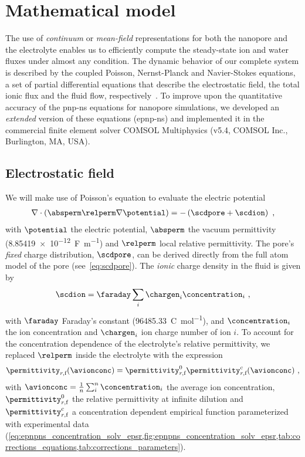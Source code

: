 \section{Mathematical model}
%
\label{sec:epnp-ns:model}
%

The use of \emph{continuum} or \emph{mean-field} representations for both the nanopore and the electrolyte
enables us to efficiently compute the steady-state ion and water fluxes under almost any condition. The
dynamic behavior of our complete system is described by the coupled Poisson, Nernst-Planck and Navier-Stokes
equations, a set of partial differential equations that describe the electrostatic field, the total ionic flux
and the fluid flow, respectively~\cite{Eisenberg-1996,Cervera-2005,Lu-2012}. To improve upon the quantitative
accuracy of the \gls{pnp-ns} equations for nanopore simulations, we developed an \emph{extended} version of
these equations ({\gls{epnp-ns}}) and implemented it in the commercial finite element solver {COMSOL}
Multiphysics (v5.4, COMSOL Inc., Burlington, MA, USA). 

\subsection{Electrostatic field}
%
\label{sec:epnp-ns:electrostatic_field}
%

We will make use of Poisson's equation to evaluate the electric potential
%
\begin{align}
  \label{eq:poisson}
  \nabla \cdot \left(\absperm \relperm \nabla \potential \right) = -\left( \scdpore + \scdion \right)
  \text{ ,}
\end{align}
%
with $\potential$ the electric potential, $\absperm$ the vacuum permittivity
(\SI{8.85419e-12}{\farad\per\meter}) and $\relperm$ local relative permittivity. The pore's \emph{fixed}
charge distribution, $\scdpore$,  can be derived directly from the full atom model of the pore
(see~\cref{eq:scdpore}). The \emph{ionic} charge density in the fluid is given by
%
\begin{align}\label{eq:scdion}
  \scdion = \faraday\sum_{i}\chargen_{i}\concentration_{i}
  \text{ ,}
\end{align}
%
with $\faraday$ Faraday's constant (\SI{96485.33}{\coulomb\per\mole}), and $\concentration_{i}$ the ion
concentration and $\chargen_{i}$ ion charge number of ion $i$. To account for the concentration dependence of
the electrolyte's relative permittivity, we replaced $\relperm$ inside the electrolyte with the expression
%
\begin{align}\label{eq:epnp-ns_relperm_concentration}
  \permittivity_{r,\text{f}}(\avionconc) =
        \permittivity_{r,\text{f}}^0 \permittivity_{r,\text{f}}^c(\avionconc)
  \text{ ,}
\end{align}
%
with $\avionconc=\frac{1}{n}\sum_{i}^{n}\concentration_{i}$ the average ion concentration,
$\permittivity_{r,\text{f}}^0$ the relative permittivity at infinite dilution and
$\permittivity_{r,\text{f}}^c$ a concentration dependent empirical function parameterized with experimental
data
(\cref{eq:epnpns_concentration_solv_epsr,fig:epnpns_concentration_solv_epsr,tab:corrections_equations,tab:corrections_parameters}).

